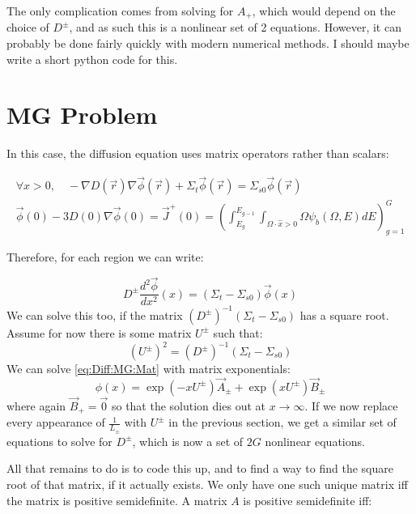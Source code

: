 \documentclass[a4paper,letterpaper,12pt,oneside,draft]{article}
\newcommand{\MG}{MG }
\newcommand{\intg}[2][g]{\ensuremath{\int_{E_{#1}}^{E_{#1-1}} #2 dE}}
\newcommand{\vr}{\ensuremath{\vec{r}}}
\begin{document}
    The only complication comes from solving for $A_+$, which would depend on the choice of $D^\pm$, and as such this is a nonlinear set of 2 equations. However, it can probably be done fairly quickly with modern numerical methods. I should maybe write a short python code for this.
    
\section{\MG Problem}
    In this case, the diffusion equation uses matrix operators rather than scalars:
    
    \begin{gather}
    \label{eq:Diff:MG}
    \forall x>0, \quad-\nabla D(\vr)\nabla\vec{\phi}(\vr) + \Sigma_{t}\vec{\phi}(\vr) = \Sigma_{s0}\vec{\phi}(\vr) \\
    \label{eq:Diff:MG:BC}
    \vec{\phi}(0) - 3D(0)\nabla\vec{\phi}(0) = \vec{J}^+(0) = \left(\intg{\int_{\Omega\cdot\hat{x}>0}\Omega\psi_b(\Omega,E)}\right)_{g=1}^{G}
    \end{gather}
    
    Therefore, for each region we can write:
    
    \begin{equation}
    \label{eq:Diff:MG:Mat}
        D^\pm \frac{d^2\vec{\phi}}{dx^2}(x) = (\Sigma_t-\Sigma_{s0})\vec{\phi}(x)
    \end{equation}
    We can solve this too, if the matrix $(D^\pm)^{-1}(\Sigma_t-\Sigma_{s0})$ has a square root. Assume for now there is some matrix $U^\pm$ such that:
    \begin{equation}
    \label{eq:def:L:MG}
        (U^\pm)^2=(D^\pm)^{-1}(\Sigma_t-\Sigma_{s0})
    \end{equation}
    We can solve \cref{eq:Diff:MG:Mat} with matrix exponentials:
    \begin{equation}
    \label{eq:Diff:MG:Sol}
        \phi(x) = \exp(-xU^\pm)\vec{A}_\pm + \exp(xU^\pm)\vec{B}_\pm 
    \end{equation}
    where again $\vec{B}_+=\vec{0}$ so that the solution dies out at $x\to\infty$. If we now replace every appearance of $\frac{1}{L_\pm}$ with $U^\pm$ in the previous section, we get a similar set of equations to solve for $D^\pm$, which is now a set of $2G$ nonlinear equations.
    
    All that remains to do is to code this up, and to find a way to find the square root of that matrix, if it actually exists. We only have one such unique matrix iff the matrix is positive semidefinite. A matrix $A$ is positive semidefinite iff:
    
\end{document}
